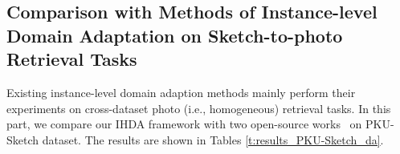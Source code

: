 \documentclass[journal]{IEEEtran}
\begin{document}
\subsection{Comparison with Methods of Instance-level Domain Adaptation on Sketch-to-photo Retrieval Tasks}

Existing instance-level domain adaption methods mainly perform their experiments on cross-dataset photo (i.e., homogeneous) retrieval tasks. In this part, we compare our IHDA framework with two open-source works~\cite{ge2020mutual,song2020unsupervised} on PKU-Sketch dataset. The results are shown in Tables \ref{t:results_PKU-Sketch_da}.

\tabcolsep=4pt
\begin{table}[!ht]
\centering
\caption{The performance of sketch-to-photo retrieval on the PKU-Sketch dataset (compared with DA methods).}
\label{t:results_PKU-Sketch_da}
\end{table}
\end{document}
